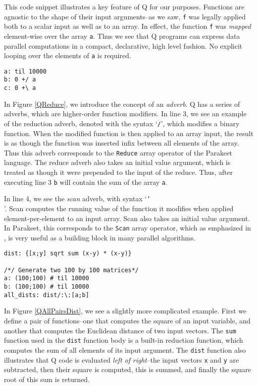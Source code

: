 \documentclass[preprint]{sigplanconf}
\begin{document}
This code snippet illustrates a key feature of Q for our purposes.  Functions
are agnostic to the shape of their input arguments--as we saw, \texttt{f} was
legally applied both to a scalar input as well as to an array.  In effect, the
function \texttt{f} was {\it mapped} element-wise over the array \texttt{a}.
Thus we see that Q programs can express data parallel computations in a compact,
declarative, high level fashion.  No explicit looping over the elements of
\texttt{a} is required.

\begin{lstlisting}[caption=Q Reductions Example]
a: til 10000
b: 0 +/ a
c: 0 +\ a
\end{lstlisting}
\label{QReduce}


In Figure \ref{QReduce}, we introduce the concept of an \emph{adverb}.  Q has a
series of adverbs, which are higher-order function modifiers.  In
line 3, we see an example of the reduction adverb, denoted with the syntax
`\texttt{/}', which modifies a binary function. When the modified function is
then applied to an array input, the result is as though the function was
inserted infix between all elements of the array.  Thus this adverb corresponds
to the \texttt{Reduce} array operator of the Parakeet language.  The reduce
adverb also takes an initial value argument, which is treated as though it were
prepended to the input of the reduce.  Thus, after executing line 3 \texttt{b}
will contain the sum of the array \texttt{a}.

In line 4, we see the \emph{scan} adverb, with syntax `\texttt{\char`\\}'.
Scan computes the running value of the function it modifies when applied
element-per-element to an input array. Scan also takes an initial value
argument.  In Parakeet, this corresponds to the \texttt{Scan} array operator,
which as emphasized in \cite{Blel90}, is very useful as a building block in many
parallel algorithms.

\begin{lstlisting}[caption=Q All-Pairs Distance Example]
dist: {[x;y] sqrt sum (x-y) * (x-y)}

/*/ Generate two 100 by 100 matrices*/
a: (100;100) # til 10000
b: (100;100) # til 10000
all_dists: dist/:\:[a;b]
\end{lstlisting}
\label{QAllPairsDist}

In Figure \ref{QAllPairsDist}, we see a slightly more complicated example.
First we define a pair of functions--one that computes the square of an input
variable, and another that computes the Euclidean distance of two input
vectors.  The \texttt{sum} function used in the \texttt{dist} function body is a
built-in reduction function, which computes the sum of all elements of its input
argument.  The \texttt{dist} function also illustrates that Q code is evaluated
\emph{left of right}--the input vectors \texttt{x} and \texttt{y} are
subtracted, then their square is computed, this is summed, and finally the
square root of this sum is returned.
\end{document}
